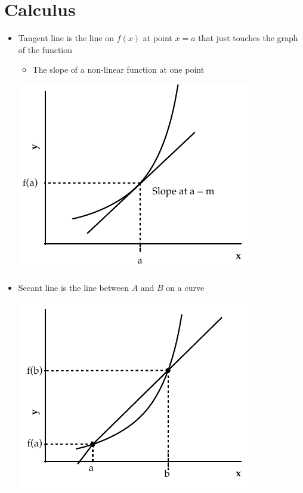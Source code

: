 \section{Calculus}


\begin{itemize}
  \item Tangent line is the line on $f(x)$ at point $x = a$ that just touches the
	graph of the function
	    \begin{itemize}
	        \item The slope of a non-linear function at one point
	    \end{itemize} 
	    
	    \begin{center}
	        \includegraphics{tangent_line}
	    \end{center}
	    
  \item Secant line is the line between $A$ and $B$ on a curve
      \begin{center}
          \includegraphics{secant_line}
      \end{center}
\end{itemize}

